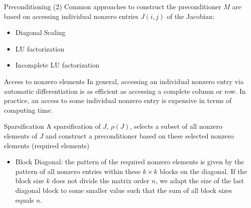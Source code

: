 \documentclass{beamer}
\newcommand{\sparsifysymbol}{\ensuremath{\rho}}
\newcommand{\sparsify}[1]{\ensuremath{\sparsifysymbol(#1)}}
\begin{document}
\begin{frame}{Preconditioning (2)}
Common approaches to construct the preconditioner $M$ are based on accessing individual
nonzero entries $J(i,j)$ of the Jacobian:

\begin{itemize}
\item Diagonal Scaling 
\item LU factorization 
\item Incomplete LU factorization
\end{itemize}

\begin{alertblock}{Access to nonzero elements}
 In general, accessing an
individual nonzero entry via automatic differentiation is as efficient as accessing a
complete column or row. In practice, an access to some individual nonzero entry is
 expensive in terms of computing time.
\end{alertblock}
\end{frame}

\begin{frame}{Sparsification}
A sparsification of $J$, \sparsify{J}, selects a 
subset of all nonzero elements of $J$ and construct a
preconditioner based on these selected nonzero elements (required elements)
\begin{itemize}
\item Block Diagonal: the pattern of the required nonzero elements is
given by the pattern of all nonzero entries within these $k\times k$ blocks on the
diagonal. If the block size $k$ does not divide the matrix order $n$, we adapt the size
of the last diagonal block to some smaller value such that the sum of all block sizes
equals $n$.
\end{itemize}
\end{frame}
\end{document}
